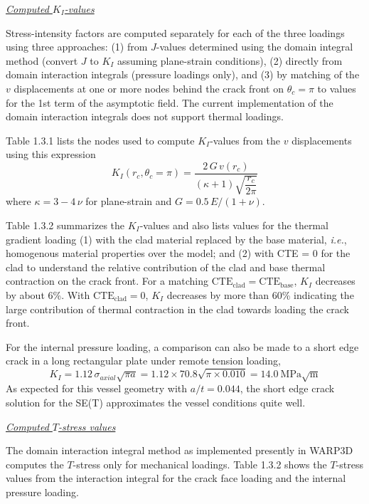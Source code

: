\documentclass[11pt]{report}
\numberwithin{equation}{section}
\newcommand{\ul} {\underline}
\newcommand{\ie}{\emph{i.e.},\xspace}
\newcommand{\ti}{\emph}
\newcommand{\nid}{\noindent}
\begin{document}
\nid \ti{\ul{Computed $K_I$-values} }

\nid Stress-intensity factors are computed separately for each of the three loadings using three 
approaches: (1) from $J$-values determined using the domain integral method 
(convert $J$ to $K_I$ assuming plane-strain conditions), (2) directly from domain interaction integrals
(pressure loadings only), and (3) by matching of the $v$ displacements at one or more nodes
behind the crack front on $\theta_c=\pi$ to values for the 1st term of the asymptotic field.
The current implementation of the
domain interaction integrals does not support thermal loadings.

Table 1.3.1 lists the nodes used to compute $K_I$-values from the $v$ displacements using this
expression
%
\begin{equation}\label{E:KIfromv}
K_I(r_c,\theta_c=\pi) = \frac{2 \,G \,v(r_c)}{(\kappa + 1) \sqrt{\dfrac{r_c}{2\pi}}}
\end{equation}
%
\nid where $\kappa=3-4\,\nu$ for plane-strain and $G=0.5 \,E / (1+\nu)$.

Table 1.3.2 summarizes the $K_I$-values and also lists values for the thermal gradient loading
(1) with the clad material replaced by the base material, \ie homogenous material properties
over the model; and (2) with CTE = 0 for the clad to understand the relative
contribution of the clad and base thermal contraction on the
crack front. For a matching $\mathrm{CTE_{clad}=CTE_{base}}$,  $K_I$ 
decreases by about  6\%. With  $\mathrm{CTE_{clad}=0}$, $K_I$ decreases by more than
60\% indicating the large contribution of thermal contraction in the clad towards loading
the crack front.

For the internal pressure loading, a comparison can also be made to a short edge crack in a long 
rectangular plate under remote tension loading,
%
\begin{equation}\label{E:edgecrack}
K_I = 1.12 \,\sigma_{axial}\sqrt{\pi a} = 1.12 \times 70.8 \sqrt{\pi \times 0.010} = 14.0\ \mathrm{MPa\sqrt{m}}
\end{equation}
%
\nid  As  expected for this
vessel geometry with $a/t=0.044$, the short edge crack solution for the SE(T) 
approximates the vessel conditions quite well.

\nid \ti{\ul{Computed $T$-stress values} }

\nid The domain interaction integral method as implemented presently in WARP3D computes the $T$-stress 
only for mechanical loadings. Table 1.3.2 shows the $T$-stress values from the interaction
integral for the crack face loading and the internal pressure loading.
\end{document}
